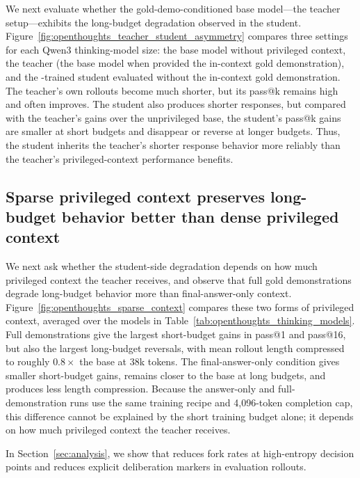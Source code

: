 

We next evaluate whether the gold-demo-conditioned base model---the \opsd{}
teacher setup---exhibits the long-budget degradation observed in the \opsd{}
student. Figure~\ref{fig:openthoughts_teacher_student_asymmetry} compares three
settings for each Qwen3 thinking-model size: the base model without privileged
context, the \opsd{} teacher (the base model when provided the in-context gold
demonstration), and the \opsd{}-trained student evaluated without the in-context
gold demonstration. The teacher's own rollouts become much shorter, but its
pass@k remains high and often improves. The student also produces shorter
responses, but compared with the teacher's gains over
the unprivileged base, the student's pass@k gains are smaller at short budgets
and disappear or reverse at longer budgets. Thus, the student inherits the
teacher's shorter response behavior more reliably than the teacher's
privileged-context performance benefits.

\subsection{Sparse privileged context preserves long-budget behavior better than dense privileged context}



We next ask whether the student-side degradation depends on how much privileged
context the teacher receives, and observe that full gold demonstrations degrade
long-budget behavior more than final-answer-only context.
Figure~\ref{fig:openthoughts_sparse_context} compares these two forms
of privileged context, averaged over the models in
Table~\ref{tab:openthoughts_thinking_models}. Full demonstrations give the
largest short-budget gains in pass@1 and pass@16, but also the largest
long-budget reversals, with mean rollout length compressed to roughly
$0.8\times$ the base at 38k tokens. The final-answer-only condition gives
smaller short-budget gains, remains closer to the base at long budgets, and
produces less length compression. Because the answer-only and full-demonstration
runs use the same training recipe and 4,096-token completion cap, this difference
cannot be explained by the short training budget alone; it depends on how much
privileged context the teacher receives.

In Section~\ref{sec:analysis}, we show that \opsd{} reduces fork rates at
high-entropy decision points and reduces explicit deliberation markers in
evaluation rollouts.

